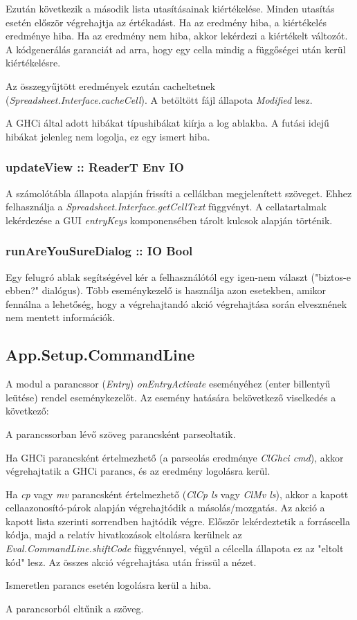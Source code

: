 Ezután következik a második lista utasításainak kiértékelése. Minden utasítás esetén először végrehajtja az értékadást. Ha az eredmény hiba, a kiértékelés eredménye hiba. Ha az eredmény nem hiba, akkor lekérdezi a kiértékelt változót. A kódgenerálás garanciát ad arra, hogy egy cella mindig a függőségei után kerül kiértékelésre.

Az összegyűjtött eredmények ezután cacheltetnek \mbox{(\textit{Spreadsheet.Interface.cacheCell})}. A betöltött fájl állapota \textit{Modified} lesz.

A GHCi által adott hibákat típushibákat kiírja a log ablakba. A futási idejű hibákat jelenleg nem logolja, ez egy ismert hiba.

\subsubsection{updateView :: ReaderT Env IO}

A számolótábla állapota alapján frissíti a cellákban megjelenített szöveget. Ehhez felhasználja a \textit{Spreadsheet.Interface.getCellText} függvényt. A cellatartalmak lekérdezése a GUI \textit{entryKeys} komponensében tárolt kulcsok alapján történik.

\subsubsection{runAreYouSureDialog :: IO Bool}

Egy felugró ablak segítségével kér a felhasználótól egy igen-nem választ ("biztos-e ebben?" dialógus). Több eseménykezelő is használja azon esetekben, amikor fennálna a lehetőség, hogy a végrehajtandó akció végrehajtása során elvesznének nem mentett információk.

\subsection{App.Setup.CommandLine}

A modul a parancssor (\textit{Entry}) \textit{onEntryActivate} eseményéhez (enter billentyű leütése) rendel eseménykezelőt. Az esemény hatására bekövetkező viselkedés a következő:
\begin{compactenum}
	\item A parancssorban lévő szöveg parancsként parseoltatik.
	\item Ha GHCi parancsként értelmezhető (a parseolás eredménye \textit{ClGhci cmd}), akkor végrehajtatik a GHCi parancs, és az eredmény logolásra kerül.
	\item Ha \textit{cp} vagy \textit{mv} parancsként értelmezhető (\textit{ClCp ls} vagy \textit{ClMv ls}), akkor a kapott cellaazonosító-párok alapján végrehajtódik a másolás/mozgatás. Az akció a kapott lista szerinti sorrendben hajtódik végre. Először lekérdeztetik a forráscella kódja, majd a relatív hivatkozások eltolásra kerülnek az \textit{Eval.CommandLine.shiftCode} függvénnyel, végül a célcella állapota ez az "eltolt kód" lesz. Az összes akció végrehajtása után frissül a nézet.
	\item Ismeretlen parancs esetén logolásra kerül a hiba.
	\item A parancsorból eltűnik a szöveg.
\end{compactenum}

